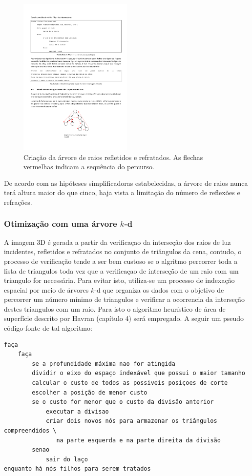 \documentclass[a4paper,12pt]{article}
\begin{document}
\begin{figure}[htb]
  \centering
  \includegraphics[width=0.5\textwidth]{figures/ray_tree}
  \caption{Criação da árvore de raios refletidos e refratados. As flechas
    vermelhas indicam a sequência do percurso.}
  \label{fig:ray_tree}
\end{figure}

De acordo com as hipóteses simplificadoras estabelecidas, a árvore de raios
nunca terá altura maior do que cinco, haja vista a limitação do número
de reflexões e refrações.

\subsubsection{Otimização com uma árvore $k$-d}
A imagem 3D é gerada a partir da verificaçao da interseção dos raios de luz
incidentes, refletidos e refratados no conjunto de triângulos da cena, contudo,
o processo de verificação tende a ser bem custoso se o algritmo percorrer toda a
lista de triangulos toda vez que a verificaçao de interseção de um raio com um
triangulo for necessária. Para evitar isto, utiliza-se um processo de indexação
espacial por meio de árvores $k$-d que organiza os dados com o objetivo de
percorrer um número mínimo de triangulos e verificar a ocorrencia da interseção
destes triangulos com um raio. Para isto o algoritmo heurístico de área de
superfície descrito por Havran \cite{havran} (capítulo 4) será empregado. A
seguir um pseudo código-fonte de tal algoritmo:

\begin{footnotesize}
\begin{verbatim}
faça
    faça
        se a profundidade máxima nao for atingida
        dividir o eixo do espaço indexável que possui o maior tamanho
        calcular o custo de todos as possiveis posiçoes de corte
        escolher a posição de menor custo
        se o custo for menor que o custo da divisão anterior
            executar a divisao
            criar dois novos nós para armazenar os triângulos compreendidos \
               na parte esquerda e na parte direita da divisão
        senao
            sair do laço
enquanto há nós filhos para serem tratados
\end{verbatim}
\end{footnotesize}
\end{document}
